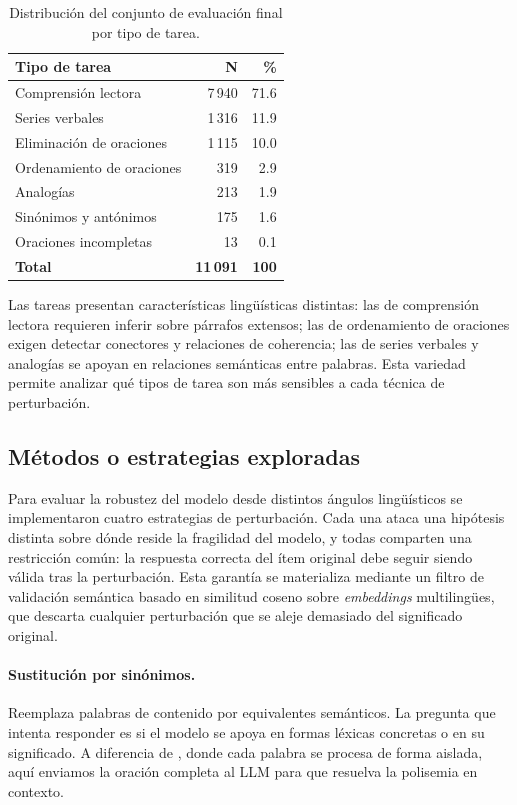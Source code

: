 \documentclass[11pt]{article}
\begin{document}
\begin{table}[h]
  \centering
  \small
  \begin{tabular}{lrr}
    \toprule
    \textbf{Tipo de tarea} & \textbf{N} & \textbf{\%} \\
    \midrule
    Comprensión lectora        & 7\,940 & 71.6 \\
    Series verbales            & 1\,316 & 11.9 \\
    Eliminación de oraciones   & 1\,115 & 10.0 \\
    Ordenamiento de oraciones  &   319  &  2.9 \\
    Analogías                  &   213  &  1.9 \\
    Sinónimos y antónimos      &   175  &  1.6 \\
    Oraciones incompletas      &    13  &  0.1 \\
    \midrule
    \textbf{Total}             & \textbf{11\,091} & \textbf{100} \\
    \bottomrule
  \end{tabular}
  \caption{Distribución del conjunto de evaluación final por tipo de tarea.}
  \label{tab:dataset}
\end{table}

Las tareas presentan características lingüísticas distintas: las de comprensión
lectora requieren inferir sobre párrafos extensos; las de ordenamiento de
oraciones exigen detectar conectores y relaciones de coherencia; las de series
verbales y analogías se apoyan en relaciones semánticas entre palabras.
Esta variedad permite analizar qué tipos de tarea son más sensibles a cada
técnica de perturbación.

\subsection{Métodos o estrategias exploradas}
\label{sec:methods}

Para evaluar la robustez del modelo desde distintos ángulos lingüísticos
se implementaron cuatro estrategias de perturbación. Cada una ataca una
hipótesis distinta sobre dónde reside la fragilidad del modelo, y todas
comparten una restricción común: la respuesta correcta del ítem
original debe seguir siendo válida tras la perturbación. Esta garantía
se materializa mediante un filtro de validación semántica basado en
similitud coseno sobre \textit{embeddings} multilingües, que descarta
cualquier perturbación que se aleje demasiado del significado original.

\paragraph{Sustitución por sinónimos.}
Reemplaza palabras de contenido por equivalentes semánticos. La pregunta
que intenta responder es si el modelo se apoya en formas léxicas
concretas o en su significado. A diferencia de \citet{jin-etal-2020-bert},
donde cada palabra se procesa de forma aislada, aquí enviamos la
oración completa al LLM para que resuelva la polisemia en contexto.
\end{document}
